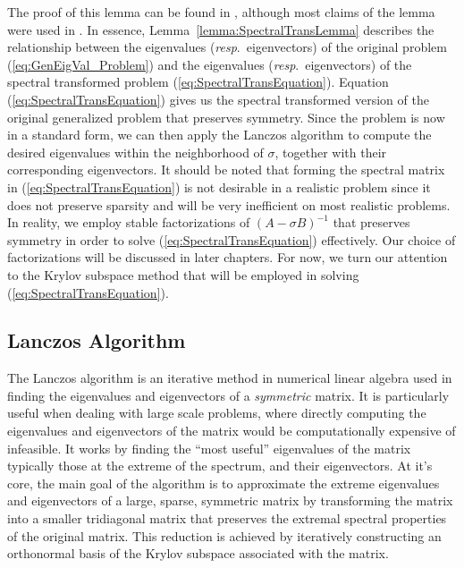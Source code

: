  The proof of this lemma can be found in \cite{stewart2024spectraltransformationdensesymmetric}, although most claims of the lemma were used in \cite{Ericsson1980TheST}. In essence, Lemma~\ref{lemma:SpectralTransLemma} describes the relationship between the eigenvalues (\textit{resp}.\ eigenvectors) of the original problem (\ref{eq:GenEigVal_Problem}) and the eigenvalues (\textit{resp}.\ eigenvectors) of the spectral transformed problem (\ref{eq:SpectralTransEquation}). Equation (\ref{eq:SpectralTransEquation}) gives us the spectral transformed version of the original generalized problem that preserves symmetry. Since the problem is now in a standard form, we can then apply the Lanczos algorithm to compute the desired eigenvalues within the neighborhood of $\sigma$, together with their corresponding eigenvectors. It should be noted that forming the spectral matrix in (\ref{eq:SpectralTransEquation}) is not desirable in a realistic problem since it does not preserve sparsity and will be very inefficient on most realistic problems. In reality, we employ stable factorizations of $(A-\sigma B)^{-1}$ that preserves symmetry in order to solve (\ref{eq:SpectralTransEquation}) effectively. Our choice of factorizations will be discussed in later chapters. For now, we turn our attention to the Krylov subspace method that will be employed in solving (\ref{eq:SpectralTransEquation}).

\subsection{Lanczos Algorithm}\label{sec:LanczosAlgorithm}

The Lanczos algorithm is an iterative method in numerical linear algebra used in finding the eigenvalues and eigenvectors of a \textit{symmetric} matrix. It is particularly useful when dealing with large scale problems, where directly computing the eigenvalues and eigenvectors of the matrix would be computationally expensive of infeasible. It works by finding the ``most useful'' eigenvalues of the matrix \textemdash\, typically those at the extreme of the spectrum, and their eigenvectors. At it's core, the main goal of the algorithm is to approximate the extreme eigenvalues and eigenvectors of a large, sparse, symmetric matrix by transforming the matrix into a smaller tridiagonal matrix that preserves the extremal spectral properties of the original matrix. This reduction is achieved by iteratively constructing an orthonormal basis of the Krylov subspace associated with the matrix.

